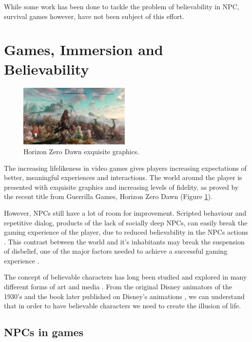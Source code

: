 While some work has been done to tackle the problem of believability in NPC, survival games however, have not been subject of this effort.

\section{Games, Immersion and Believability}

\begin{figure}
  \includegraphics[width=0.49\textwidth]{./Images/horizon-zero-dawn}
  \caption{Horizon Zero Dawn exquisite graphics.}
  \label{fig:horizon}
\end{figure}

The increasing lifelikeness in video games gives players increasing expectations of better, meaningful experiences and interactions.
The world around the player is presented with exquisite graphics and increasing levels of fidelity, as proved by the recent title from Guerrilla Games, Horizon Zero Dawn \cite{games:horizon} (Figure \ref{fig:horizon}).

However, NPCs still have a lot of room for improvement.
Scripted behaviour and repetitive dialog, products of the lack of socially deep NPCs, can easily break the gaming experience of the player, due to reduced believability in the NPCs actions \cite{thrainsson:emotion-games}.
This contrast between the world and it's inhabitants may break the suspension of disbelief, one of the major factors needed to achieve a successful gaming experience \cite{ijsselsteijn:userexperience}.

The concept of believable characters has long been studied and explored in many different forms of art and media \cite{bates:emotioninagents}.
From the original Disney animators of the 1930's and the book later published on Disney's animations \cite{illusionoflife}, we can understand that in order to have believable characters we need to create the illusion of life.

\subsection{NPCs in games}

